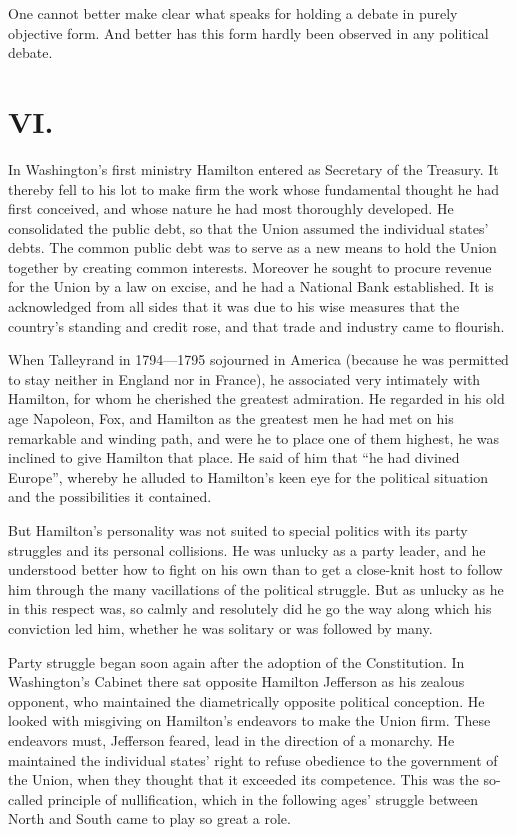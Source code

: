 \documentclass[12pt,a4paper,openany]{book}
\newcommand{\opage}[1]{\marginnote{\footnotesize\textit{[#1]}}}
\begin{document}
One cannot better make clear what speaks
for holding a debate in purely objective form. And better has this
form hardly been observed in any political debate.

\section*{VI.}

In Washington's first ministry Hamilton entered
as Secretary of the Treasury. It thereby fell to his lot to make firm
the work whose fundamental thought he had first conceived, and whose
nature he had most thoroughly developed. He consolidated the
public debt, so that the Union assumed the individual states'
debts. The common public debt was to serve as a new means
to hold the Union together by creating common interests.
\opage{140}Moreover he sought to procure revenue for the Union by a law
on excise, and he had a National Bank established. It is
acknowledged from all sides that it was due to his wise
measures that the country's standing and credit rose, and that
trade and industry came to flourish.

When Talleyrand in 1794---1795 sojourned in America (because
he was permitted to stay neither in England nor in France),
he associated very intimately with Hamilton, for whom he
cherished the greatest admiration. He regarded in his old age
Napoleon, Fox, and Hamilton as the greatest men he had
met on his remarkable and winding path, and were he to place
one of them highest, he was inclined to give Hamilton that
place. He said of him that ``he had divined Europe'',
whereby he alluded to Hamilton's keen eye for the
political situation and the possibilities it contained.

But Hamilton's personality was not suited to
special politics with its party struggles and its
personal collisions. He was unlucky as a party leader, and he
understood better how to fight on his own than to get a close-knit
host to follow him through the many
vacillations of the political struggle. But as unlucky as he in this respect
was, so calmly and resolutely did he go the way along which
his conviction led him, whether he was solitary
or was followed by many.

Party struggle began soon again after the adoption of the
Constitution. In Washington's Cabinet there sat opposite Hamilton
Jefferson as his zealous opponent, who maintained the
diametrically opposite political conception. He looked with
misgiving on Hamilton's endeavors to make the Union firm.
These endeavors must, Jefferson feared, lead in the direction
of a monarchy. He maintained the individual states' right to
refuse obedience to the government of the Union, when they thought that
it exceeded its competence. This was the so-called
principle of nullification, which in the following ages' struggle between North
and South came to play so great a role.
\end{document}
